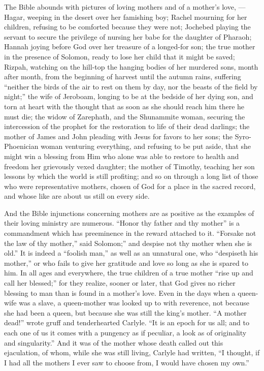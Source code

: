 \documentclass[
]{book}
\begin{document}
The Bible abounds with pictures of loving mothers and of a mother's love, --- Hagar, weeping in the desert over her famishing boy; Rachel mourning for her children, refusing to be comforted because they were not; Jochebed playing the servant to secure the privilege of nursing her babe for the daughter of Pharaoh; Hannah joying before God over her treasure of a longed-for son; the true mother in the presence of Solomon, ready to lose her child that it might be saved; Rizpah, watching on the hill-top the hanging bodies of her murdered sons, month after month, from the beginning of harvest until the autumn rains, suffering ``neither the birds of the air to rest on them by day, nor the beasts of the field by night;'' the wife of Jeroboam, longing to be at the bedside of her dying son, and torn at heart with the thought that as soon as she should reach him there he must die; the widow of Zarephath, and the Shunammite woman, securing the intercession of the prophet for the restoration to life of their dead darlings; the mother of James and John pleading with Jesus for favors to her sons; the Syro-Phoenician woman venturing everything, and refusing to be put aside, that she might win a blessing from Him who alone was able to restore to health and freedom her grievously vexed daughter; the mother of Timothy, teaching her son lessons by which the world is still profiting; and so on through a long list of those who were representative mothers, chosen of God for a place in the sacred record, and whose like are about us still on every side.

And the Bible injunctions concerning mothers are as positive as the examples of their loving ministry are numerous. ``Honor thy father and thy mother'' is a commandment which has preeminence in the reward attached to it. ``Forsake not the law of thy mother,'' said Solomon;'' and despise not thy mother when she is old.'' It is indeed a ``foolish man,'' as well as an unnatural one, who ``despiseth his mother,'' or who fails to give her gratitude and love so long as she is spared to him. In all ages and everywhere, the true children of a true mother ``rise up and call her blessed;'' for they realize, sooner or later, that God gives no richer blessing to man than is found in a mother's love. Even in the days when a queen-wife was a slave, a queen-mother was looked up to with reverence, not because she had been a queen, but because she was still the king's mother. ``A mother dead!'' wrote gruff and tenderhearted Carlyle. ``It is an epoch for us all; and to each one of us it comes with a pungency as if peculiar, a look as of originality and singularity.'' And it was of the mother whose death called out this ejaculation, of whom, while she was still living, Carlyle had written, ``I thought, if I had all the mothers I ever saw to choose from, I would have chosen my own.''
\end{document}

